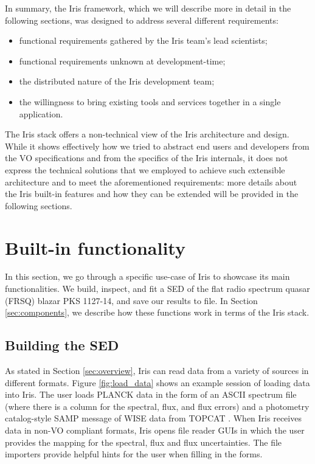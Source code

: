 \documentclass[preprint,12pt,3p]{elsarticle}
\begin{document}
In summary, the Iris framework, which we will describe more in detail in the following sections, was designed to address several different requirements:
\begin{itemize}
\item functional requirements gathered by the Iris team's lead scientists;
\item functional requirements unknown at development-time;
\item the distributed nature of the Iris development team;
\item the willingness to bring existing tools and services together in a single application.
\end{itemize}

The Iris stack offers a non-technical view of the Iris architecture and design. While it shows effectively how we tried to abstract end users and developers from the VO specifications and from the specifics of the Iris internals, it does not express the technical solutions that we employed to achieve such extensible architecture and to meet the aforementioned requirements: more details about the Iris built-in features and how they can be extended will be provided in the following sections.

\section{Built-in functionality}
\label{sec:builtin}

In this section, we go through a specific use-case of Iris to showcase its main functionalities. We build, inspect, and fit a SED of the flat radio spectrum quasar (FRSQ) blazar PKS 1127-14, and save our results to file. In Section \ref{sec:components}, we describe how these functions work in terms of the Iris stack.

\subsection{Building the SED}

As stated in Section \ref{sec:overview}, Iris can read data from a variety of sources in different formats. Figure \ref{fig:load_data} shows an example session of loading data into Iris. The user loads PLANCK data in the form of an ASCII spectrum file (where there is a column for the spectral, flux, and flux errors) and a photometry catalog-style SAMP message of WISE data from TOPCAT \citep{2005ASPC..347...29T}. When Iris receives data in non-VO compliant formats, Iris opens file reader GUIs in which the user provides the mapping for the spectral, flux and flux uncertainties. The file importers provide helpful hints for the user when filling in the forms.
\end{document}
